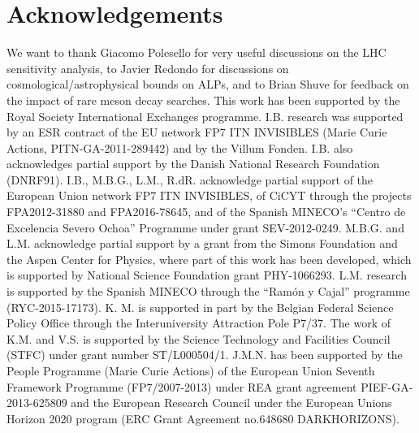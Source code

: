 \documentclass[11pt]{article}
\renewcommand{\[}{\begin{equation}}
\renewcommand{\]}{\end{equation}}
\begin{document}
 



 




 
\section*{Acknowledgements}

We want to thank Giacomo Polesello for very useful discussions on the LHC sensitivity analysis,  to Javier Redondo for discussions on cosmological/astrophysical bounds on ALPs, and to Brian Shuve for feedback on the impact of rare meson decay searches.  This work has been supported by the Royal Society International Exchanges programme.  
I.B. research was supported by an ESR contract of the EU network FP7 ITN INVISIBLES (Marie Curie Actions, PITN-GA-2011-289442) and by the Villum Fonden. I.B. also acknowledges partial support by the Danish National Research Foundation (DNRF91). I.B., M.B.G., L.M., R.dR. acknowledge partial 
support of the European Union network FP7 ITN INVISIBLES, of CiCYT through the projects FPA2012-31880 and FPA2016-78645, and of the Spanish MINECO's ``Centro de Excelencia Severo Ochoa'' Programme under 
grant SEV-2012-0249. M.B.G. and L.M. acknowledge partial support by a grant from the Simons Foundation and  the Aspen Center for Physics, where part of this work has been developed, 
which is supported by National Science Foundation grant PHY-1066293. L.M. research is supported by the Spanish MINECO through the ``Ram\'on y Cajal'' programme (RYC-2015-17173). K. M. is supported in part by the Belgian Federal Science Policy Office through the Interuniversity Attraction Pole P7/37. The work of K.M. and V.S. is supported by the Science Technology and Facilities Council (STFC) under grant number ST/L000504/1.
J.M.N. has been supported by the People Programme (Marie Curie Actions) of the European Union Seventh Framework Programme (FP7/2007-2013) under REA grant agreement PIEF-GA-2013-625809 and the European Research Council under the  European Unions Horizon 2020 program (ERC Grant Agreement no.648680 DARKHORIZONS).
\end{document}
